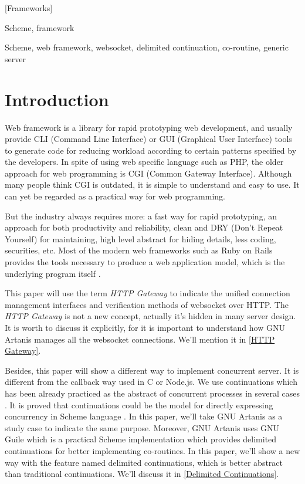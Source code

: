 \documentclass[numbers,numberedpars]{sigplanconf}
\begin{document}
[Frameworks]

\terms
Scheme, framework

\keywords
Scheme, web framework, websocket, delimited continuation, co-routine, generic server

\section{Introduction}

Web framework is a library for rapid prototyping web development, and usually provide CLI (Command Line Interface) or
GUI (Graphical User Interface) tools to generate code for reducing workload according to certain patterns specified by the developers.
In spite of using web specific language such as PHP, the older approach for web programming is CGI (Common Gateway Interface).
Although many people think CGI is outdated, it is simple to understand and easy to use.
It can yet be regarded as a practical way for web programming.

But the industry always requires more: a fast way for rapid prototyping, an approach for both productivity and reliability, clean and DRY
(Don't Repeat Yourself) for maintaining, high level abstract for hiding details, less coding, securities, etc.
Most of the modern web frameworks such as Ruby on Rails provides the tools necessary to produce a web application model,
which is the underlying program itself \citep{1597080}. 

This paper will use the term {\it HTTP Gateway} to indicate the unified connection management interfaces and verification methods of websocket
over HTTP. The {\it HTTP Gateway} is not a new concept, actually it's hidden in many server design. It is worth to discuss it explicitly,
for it is important to understand how GNU Artanis manages all the websocket connections. We'll mention it in \ref{HTTP Gateway}.

Besides, this paper will show a different way to implement concurrent server. It is different from the callback way used in C or Node.js.
We use continuations which has been already practiced as the abstract of concurrent processes in several cases
\citep{Krishnamurthi2007}\citep{Hieb:1990:CC:99164.99178}\citep{Hieb:1994:SUB:184324.184330}.
It is proved that continuations could be the model for directly expressing concurrency in Scheme language \citep{shivers1997continuations}.
In this paper, we'll take GNU Artanis as a study case to indicate the same purpose. Moreover,
GNU Artanis uses GNU Guile which is a practical Scheme implementation which provides delimited continuations for better implementing co-routines.
In this paper, we'll show a new way with the feature named delimited continuations, which is better abstract than traditional continuations.
We'll discuss it in \ref{Delimited Continuations}.
\end{document}
